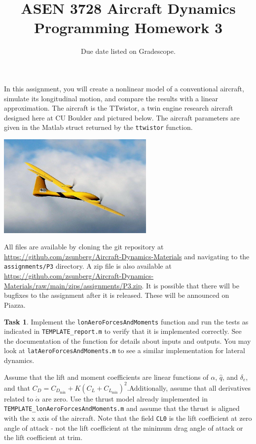 \documentclass{article}
\title{ASEN 3728 Aircraft Dynamics\\Programming Homework 3}
\date{Due date listed on Gradescope.}
\theoremstyle{definition}
\newtheorem{task}{Task}
\begin{document}
\maketitle

In this assignment, you will create a nonlinear model of a conventional aircraft, simulate its longitudinal motion, and compare the results with a linear approximation.
The aircraft is the TTwistor, a twin engine research aircraft designed here at CU Boulder and pictured below. The aircraft parameters are given in the Matlab struct returned by the \texttt{ttwistor} function.

\begin{center}
\includegraphics[width=3in]{ttwistor.jpg}
\end{center}

All files are available by cloning the git repository at \url{https://github.com/zsunberg/Aircraft-Dynamics-Materials} and navigating to the \texttt{assignments/P3} directory. A zip file is also available at \url{https://github.com/zsunberg/Aircraft-Dynamics-Materials/raw/main/zips/assignments/P3.zip}. It is possible that there will be bugfixes to the assignment after it is released. These will be announced on Piazza.

\begin{task}
    Implement the \texttt{lonAeroForcesAndMoments} function and run the tests as indicated in \texttt{TEMPLATE\_report.m} to verify that it is implemented correctly. See the documentation of the function for details about inputs and outputs. You may look at \texttt{latAeroForcesAndMoments.m} to see a similar implementation for lateral dynamics.

    Assume that the lift and moment coefficients are linear functions of $\alpha$, $\hat{q}$, and $\delta_e$, and that $C_D = C_{D_\text{min}} + K (C_L + C_{L_\text{min}})^2$.Additionally, assume that all derivatives related to $\dot{\alpha}$ are zero. Use the thrust model already implemented in \texttt{TEMPLATE\_lonAeroForcesAndMoments.m} and assume that the thrust is aligned with the x axis of the aircraft. Note that the field \texttt{CL0} is the lift coefficient at zero angle of attack - not the lift coefficient at the minimum drag angle of attack or the lift coefficient at trim.
\end{task}
\end{document}

